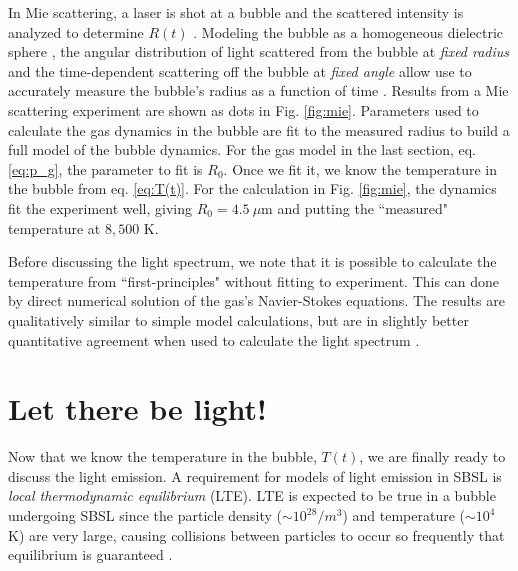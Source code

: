 \documentclass[11pt,prb,aps,nofootinbib,superscriptaddress,floatfix]{revtex4-2}
\begin{document}
In Mie scattering, a laser is shot at a bubble and the scattered intensity is analyzed to determine $R(t)$ \cite{matula1999inertial,lentz1995mie}. Modeling the bubble as a homogeneous dielectric sphere \cite{jackson1999classical}, the angular distribution of light scattered from the bubble at \emph{fixed radius} and the time-dependent scattering off the bubble at \emph{fixed angle} allow use to accurately measure the bubble's radius as a function of time \cite{brenner2002single}. Results from a Mie scattering experiment are shown as dots in Fig. \ref{fig:mie}. Parameters used to calculate the gas dynamics in the bubble are fit to the measured radius to build a full model of the bubble dynamics. For the gas model in the last section, eq. \ref{eq:p_g}, the parameter to fit is $R_0$. Once we fit it, we know the temperature in the bubble from eq. \ref{eq:T(t)}. For the calculation in Fig. \ref{fig:mie}, the dynamics fit the experiment well, giving $R_0=4.5~ \mu$m and putting the ``measured" temperature at $8,500$ K. 

Before discussing the light spectrum, we note that it is possible to calculate the temperature from ``first-principles" without fitting to experiment. This can done by direct numerical solution of the gas's Navier-Stokes equations. The results are qualitatively similar to simple model calculations, but are in slightly better quantitative agreement when used to calculate the light spectrum \cite{an2009diagnosing,an2008spectral,an2006mechanism}. 

\section{Let there be light!}

Now that we know the temperature in the bubble, $T(t)$, we are finally ready to discuss the light emission. A requirement for models of light emission in SBSL is \emph{local thermodynamic equilibrium} (LTE). LTE is expected to be true in a bubble undergoing SBSL since the particle density ($\sim 10^{28}/m^3$) and temperature ($\sim 10^4$ K) are very large, causing collisions between particles to occur so frequently that equilibrium is guaranteed \cite{brenner2002single,hilgenfeldt1999sonoluminescence,yasui1999mechanism}. 
\end{document}
